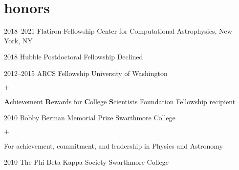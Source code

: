 \documentclass[]{luger-cv} %
\begin{document}


\section{honors}

\begin{entrylist}

\entry
{2018--2021}
{Flatiron Fellowship}
{Center for Computational Astrophysics, New York, NY}
{%
}


\entry
{2018}
{Hubble Postdoctoral Fellowship}
{Declined}
{%
}


\entry
{2012--2015}
{ARCS Fellowship}
{University of Washington}
{%
\vspace{-1em}
\begin{list}{$+$}{\cvlist}
\item \textbf{A}chievement \textbf{R}ewards for \textbf{C}ollege \textbf{S}cientists
Foundation Fellowship recipient
\end{list}
}


\entry
{2010}
{Bobby Berman Memorial Prize}
{Swarthmore College}
{%
\vspace{-1em}
\begin{list}{$+$}{\cvlist}
\item For achievement, commitment, and
leadership in Physics and Astronomy
\end{list}
}


\ifdefined \onepage \else
\entry
{2010}
{The Phi Beta Kappa Society}
{Swarthmore College}
{}
\fi


\end{entrylist}

\end{document}
